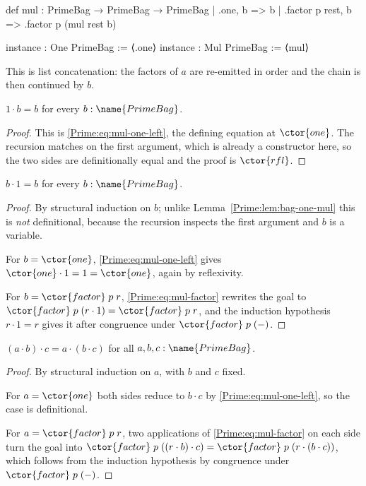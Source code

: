 \begin{leancode}
def mul : PrimeBag → PrimeBag → PrimeBag
  | .one, b => b
  | .factor p rest, b => .factor p (mul rest b)

instance : One PrimeBag := ⟨.one⟩
instance : Mul PrimeBag := ⟨mul⟩
\end{leancode}

This is list concatenation: the factors of $a$ are re-emitted in order and the
chain is then continued by $b$.

\begin{lemma}
\label{Prime:lem:bag-one-mul}
$1 \cdot b = b$ for every $b : \name{PrimeBag}$.
\end{lemma}

\begin{proof}
This is \eqref{Prime:eq:mul-one-left}, the defining equation at $\ctor{one}$.  The
recursion matches on the first argument, which is already a constructor here,
so the two sides are definitionally equal and the proof is $\ctor{rfl}$.
\end{proof}

\begin{lemma}
\label{Prime:lem:bag-mul-one}
$b \cdot 1 = b$ for every $b : \name{PrimeBag}$.
\end{lemma}

\begin{proof}
By structural induction on $b$; unlike Lemma~\ref{Prime:lem:bag-one-mul} this is
\emph{not} definitional, because the recursion inspects the first argument
and $b$ is a variable.

For $b = \ctor{one}$, \eqref{Prime:eq:mul-one-left} gives
$\ctor{one} \cdot 1 = 1 = \ctor{one}$, again by reflexivity.

For $b = \ctor{factor}\;p\;r$, \eqref{Prime:eq:mul-factor} rewrites the goal to
$\ctor{factor}\;p\;(r \cdot 1) = \ctor{factor}\;p\;r$, and the induction
hypothesis $r \cdot 1 = r$ gives it after congruence under
$\ctor{factor}\;p\;(-)$.
\end{proof}

\begin{lemma}
\label{Prime:lem:bag-assoc}
$(a \cdot b) \cdot c = a \cdot (b \cdot c)$ for all
$a, b, c : \name{PrimeBag}$.
\end{lemma}

\begin{proof}
By structural induction on $a$, with $b$ and $c$ fixed.

For $a = \ctor{one}$ both sides reduce to $b \cdot c$ by
\eqref{Prime:eq:mul-one-left}, so the case is definitional.

For $a = \ctor{factor}\;p\;r$, two applications of \eqref{Prime:eq:mul-factor} on
each side turn the goal into
$\ctor{factor}\;p\;((r \cdot b) \cdot c)
  = \ctor{factor}\;p\;(r \cdot (b \cdot c))$,
which follows from the induction hypothesis by congruence under
$\ctor{factor}\;p\;(-)$.
\end{proof}

